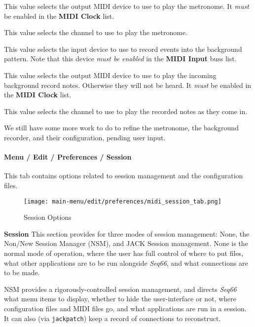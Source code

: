   This value selects the output MIDI device to use to play the metronome.
   It \textsl{must} be enabled in the \textbf{MIDI Clock} list.

   This value selects the channel to use to play the metronome.

   This value selects the input device to use to record events into the
   background pattern.
   Note that this device \textsl{must be enabled} in the \textbf{MIDI Input}
   buss list.

   This value selects the output MIDI device to use to play the incoming
   background record notes.  Otherwise they will not be heard.
   It \textsl{must} be enabled in the \textbf{MIDI Clock} list.

   This value selects the channel to use to play the recorded notes as
   they come in.

   We still have some more work to do to refine the metronome, the
   background recorder, and their configuration, pending user input.

\paragraph{Menu / Edit / Preferences / Session}
\label{paragraph:menu_edit_preferences_session}

   This tab contains options related to session management and the
   configuration files.

\begin{figure}[H]
   \centering 
   \texttt{[image: main-menu/edit/preferences/midi\_session\_tab.png]}
   \caption{Session Options}
   \label{fig:midi_session_options_tab}
\end{figure}

   \setcounter{ItemCounter}{0}      %

   \textbf{Session}
   This section provides for three modes of session management:  None, the
   Non/New Session Manager (NSM), and JACK Session management.
   None is the normal mode of operation, where the user has full control of
   where to put files, what other applications are to be run alongside
   \textsl{Seq66}, and what connections are to be made.

   NSM provides a rigorously-controlled session management, and directs
   \textsl{Seq66} what menu items to display, whether to hide the
   user-interface or not, where configuration files and MIDI files go, and what
   applications are run in a session. It can also (via \texttt{jackpatch}) keep
   a record of connections to reconstruct.

